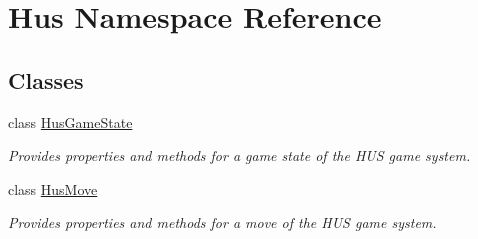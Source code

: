 \hypertarget{namespace_hus}{}\section{Hus Namespace Reference}
\label{namespace_hus}
\subsection*{Classes}
\begin{DoxyCompactItemize}
\item 
class \mbox{\hyperlink{class_hus_1_1_hus_game_state}{Hus\+Game\+State}}
\begin{DoxyCompactList}\small\item\em Provides properties and methods for a game state of the H\+US game system. \end{DoxyCompactList}\item 
class \mbox{\hyperlink{class_hus_1_1_hus_move}{Hus\+Move}}
\begin{DoxyCompactList}\small\item\em Provides properties and methods for a move of the H\+US game system. \end{DoxyCompactList}\end{DoxyCompactItemize}

